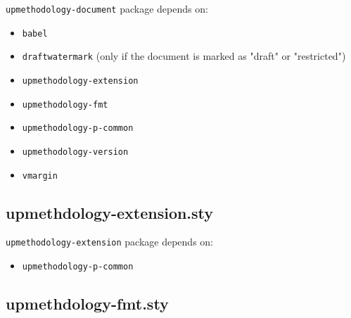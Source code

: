 \documentclass[book,taskpackage,specpackage,codepackage]{upmethodology-document}
\begin{document}
\texttt{upmethodology-document} package depends on:
\begin{itemize}
\item \texttt{babel}
\item \texttt{draftwatermark} (only if the document is marked as "draft" or "restricted")
\item \texttt{upmethodology-extension}
\item \texttt{upmethodology-fmt}
\item \texttt{upmethodology-p-common}
\item \texttt{upmethodology-version}
\item \texttt{vmargin}
\end{itemize}

\subsection{upmethdology-extension.sty}

\texttt{upmethodology-extension} package depends on:
\begin{itemize}
\item \texttt{upmethodology-p-common}
\end{itemize}

\subsection{upmethdology-fmt.sty}
\end{document}

